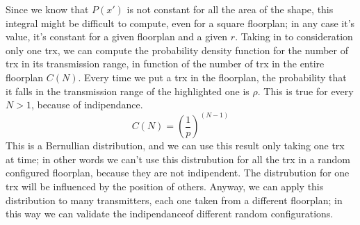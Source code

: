 Since we know that $P(x')$ is not constant for all the area of the shape, this integral might be difficult to compute,
even for a square floorplan; in any case it's value, it's constant for a given floorplan and a given $r$.
Taking in to consideration only one trx, we can compute the probability density function for the number of trx in its
transmission range, in function of the number of trx in the entire floorplan $C(N)$. Every time we put
a trx in the floorplan, the probability that it falls in the transmission range of the highlighted one is $\rho$. This is true
for every $N > 1$, because of indipendance. 
\begin{equation*}
	C(N)= \left(\frac{1}{p}\right)^{\left( N-1 \right)}
  \end{equation*}
This is a Bernullian distribution, and we can use this result only taking one trx at time; in other words we can't use this 
distrubution for all the trx in a random configured floorplan, because they are not indipendent. 
The distrubution for one trx will be influenced by the position of others. 
Anyway, we can apply this distribution to many transmitters, each one taken from a different floorplan; in this way we can 
validate the indipendanceof different random configurations.\\
